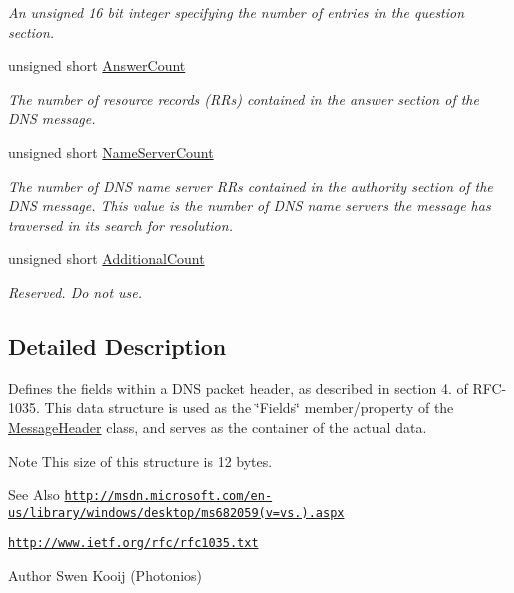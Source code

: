 \begin{DoxyCompactItemize}
\begin{DoxyCompactList}\small\item\em An unsigned 16 bit integer specifying the number of entries in the question section. \end{DoxyCompactList}\item 
unsigned short \hyperlink{struct_senergy_1_1_dns_1_1_message_header_fields_a38e5101ec862c400628d66192c5b9878}{Answer\-Count}
\begin{DoxyCompactList}\small\item\em The number of resource records (R\-Rs) contained in the answer section of the D\-N\-S message. \end{DoxyCompactList}\item 
unsigned short \hyperlink{struct_senergy_1_1_dns_1_1_message_header_fields_a963b92841b3f7fc5fc9268c963d32d8d}{Name\-Server\-Count}
\begin{DoxyCompactList}\small\item\em The number of D\-N\-S name server R\-Rs contained in the authority section of the D\-N\-S message. This value is the number of D\-N\-S name servers the message has traversed in its search for resolution. \end{DoxyCompactList}\item 
unsigned short \hyperlink{struct_senergy_1_1_dns_1_1_message_header_fields_aae6ba21a1c8baa30f0aafe90d165420f}{Additional\-Count}
\begin{DoxyCompactList}\small\item\em Reserved. Do not use. \end{DoxyCompactList}\end{DoxyCompactItemize}


\subsection{Detailed Description}
Defines the fields within a D\-N\-S packet header, as described in section 4. of R\-F\-C-\/1035. This data structure is used as the \char`\"{}\-Fields\char`\"{} member/property of the \hyperlink{class_senergy_1_1_dns_1_1_message_header}{Message\-Header} class, and serves as the container of the actual data. 

\begin{DoxyNote}{Note}
This size of this structure is 12 bytes.
\end{DoxyNote}
\begin{DoxySeeAlso}{See Also}
\href{http://msdn.microsoft.com/en-us/library/windows/desktop/ms682059(v=vs.85).aspx}{\tt http\-://msdn.\-microsoft.\-com/en-\/us/library/windows/desktop/ms682059(v=vs.).\-aspx} 

\href{http://www.ietf.org/rfc/rfc1035.txt}{\tt http\-://www.\-ietf.\-org/rfc/rfc1035.\-txt}
\end{DoxySeeAlso}
\begin{DoxyAuthor}{Author}
Swen Kooij (Photonios) 
\end{DoxyAuthor}


